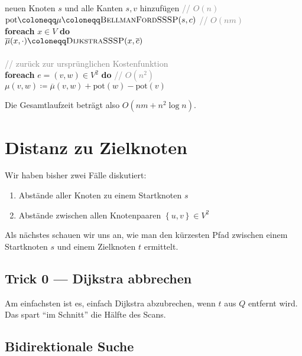 \begin{pseudocode}
  neuen Knoten \( s \) und alle Kanten \( s,v \) hinzufügen \enskip{} \textcolor{gray}{// \( O(n) \)} \\
  \( \text{pot} \coloneqq \mu \coloneqq \textsc{BellmanFordSSSP}(s,c) \) \enskip{} \textcolor{gray}{// \( O(nm) \)} \\
  \textbf{foreach} \( x \in V \) \textbf{do} \\
  \phantom{\enskip} \( \overline{\mu}(x,\cdot) \coloneqq \textsc{DijkstraSSSP}(x,\overline{c}) \) \\
  \ \\
  \textcolor{gray}{// zurück zur ursprünglichen Kostenfunktion} \\
  \textbf{foreach} \( e = (v,w) \in V^2 \) \textbf{do} \enskip \textcolor{gray}{// \( O(n^2) \)} \\
  \phantom{\enskip} \( \mu(v,w) \coloneqq \overline{\mu}(v,w) + \text{pot}(w) - \text{pot}(v) \)
\end{pseudocode}

Die Gesamtlaufzeit beträgt also \( O(nm + n^2\log n) \).

\section{Distanz zu Zielknoten}

Wir haben bisher zwei Fälle diskutiert:
\begin{enumerate}
  \item Abstände aller Knoten zu einem Startknoten \( s \)
  \item Abstände zwischen allen Knotenpaaren \( \left \{ u,v \right \} \in V^2 \)
\end{enumerate}

Als nächstes schauen wir uns an, wie man den kürzesten Pfad zwischen einem Startknoten \( s \) und einem Zielknoten \( t \) ermittelt.

\subsection{Trick 0 --- Dijkstra abbrechen}

Am einfachsten ist es, einfach Dijkstra abzubrechen, wenn \( t \) aus \( Q \) entfernt wird. Das spart ``im Schnitt'' die Hälfte des Scans.

\subsection{Bidirektionale Suche}

